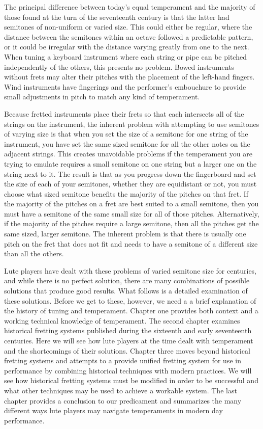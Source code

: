 The principal difference between today's equal temperament and the majority of
those found at the turn of the seventeenth century is that the latter had
semitones of non-uniform or varied size.  This could either be regular, where
the distance between the semitones within an octave followed a predictable
pattern, or it could be irregular with the distance varying greatly from one to
the next. When tuning a keyboard instrument where each string or pipe can be
pitched independently of the others, this presents no problem.  Bowed
instruments without frets may alter their pitches with the placement of the
left-hand fingers.  Wind instruments have fingerings and the performer's
embouchure to provide small adjustments in pitch to match any kind of
temperament.

Because fretted instruments place their frets so that each intersects all of the
strings on the instrument, the inherent problem with attempting to use semitones of
varying size is that when you set the size of a semitone for one string of the
instrument, you have set the same sized semitone for all the other notes on the
adjacent strings. This creates unavoidable problems if the temperament you are trying
to emulate requires a small semitone on one string but a larger one
on the string next to it. The result is that as you progress down the fingerboard and
set the size of each of your semitones, whether they are equidistant or not, you must
choose what sized semitone benefits the majority of the pitches on that fret. If the
majority of the pitches on a fret are best suited to a small semitone, then you must
have a semitone of the same small size for all of those pitches. Alternatively, if the
majority of the pitches require a large semitone, then all the pitches get the same
sized, larger semitone.  The inherent problem is that there is usually one pitch on the
fret that does not fit and needs to have a semitone of a different size than
all the others.

Lute players have dealt with these problems of varied semitone size for centuries, and
while there is no perfect solution, there are many combinations of
possible solutions that produce good results. What follows is a detailed examination
of these solutions.  Before we get to these, however, we need a a brief
explanation of the history of tuning and temperament. Chapter one provides both
context and a working technical knowledge of temperament. The second chapter
examines historical fretting systems published during the sixteenth and early
seventeenth centuries. Here we will see how lute players at the time dealt with
temperament and the shortcomings of their solutions. Chapter three moves beyond
historical fretting systems and attempts to a provide unified fretting system for use
in performance by combining historical techniques with modern practices.  We will see
how historical fretting systems must be modified in order to be successful and what
other techniques may be used to achieve a workable system. The last chapter provides a
conclusion to our predicament and summarizes the many different ways lute players
may navigate temperaments in modern day performance.
